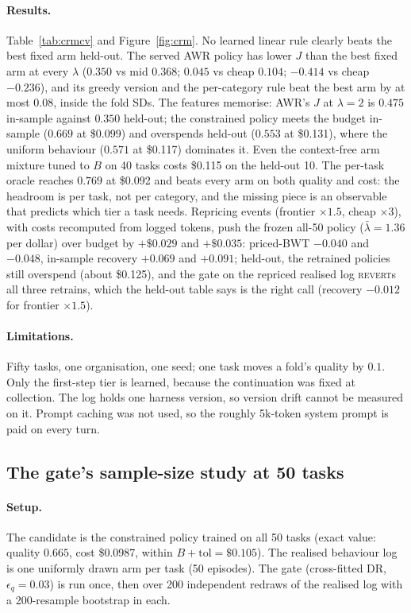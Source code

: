 \documentclass[10pt]{article}
\newcommand{\REVERT}{\textsc{revert}}
\begin{document}
\paragraph{Results.} Table~\ref{tab:crmcv} and Figure~\ref{fig:crm}. No learned linear rule clearly beats the best fixed arm held-out. The served AWR policy has lower $J$ than the best fixed arm at every $\lambda$ ($0.350$ vs mid $0.368$; $0.045$ vs cheap $0.104$; $-0.414$ vs cheap $-0.236$), and its greedy version and the per-category rule beat the best arm by at most $0.08$, inside the fold SDs. The features memorise: AWR's $J$ at $\lambda=2$ is $0.475$ in-sample against $0.350$ held-out; the constrained policy meets the budget in-sample ($0.669$ at \$0.099) and overspends held-out ($0.553$ at \$0.131), where the uniform behaviour ($0.571$ at \$0.117) dominates it. Even the context-free arm mixture tuned to $B$ on 40 tasks costs \$0.115 on the held-out 10. The per-task oracle reaches $0.769$ at \$0.092 and beats every arm on both quality and cost: the headroom is per task, not per category, and the missing piece is an observable that predicts which tier a task needs. Repricing events (frontier $\times1.5$, cheap $\times3$), with costs recomputed from logged tokens, push the frozen all-50 policy ($\bar\lambda=1.36$ per dollar) over budget by $+\$0.029$ and $+\$0.035$: priced-BWT $-0.040$ and $-0.048$, in-sample recovery $+0.069$ and $+0.091$; held-out, the retrained policies still overspend (about \$0.125), and the gate on the repriced realised log \REVERT{}s all three retrains, which the held-out table says is the right call (recovery $-0.012$ for frontier $\times1.5$).

\paragraph{Limitations.} Fifty tasks, one organisation, one seed; one task moves a fold's quality by $0.1$. Only the first-step tier is learned, because the continuation was fixed at collection. The log holds one harness version, so version drift cannot be measured on it. Prompt caching was not used, so the roughly 5k-token system prompt is paid on every turn.

\subsection{The gate's sample-size study at 50 tasks}
\label{sec:gatepower}

\paragraph{Setup.} The candidate is the constrained policy trained on all 50 tasks (exact value: quality $0.665$, cost \$0.0987, within $B+\mathrm{tol}=\$0.105$). The realised behaviour log is one uniformly drawn arm per task (50 episodes). The gate (cross-fitted DR, $\epsilon_q=0.03$) is run once, then over 200 independent redraws of the realised log with a 200-resample bootstrap in each.
\end{document}
